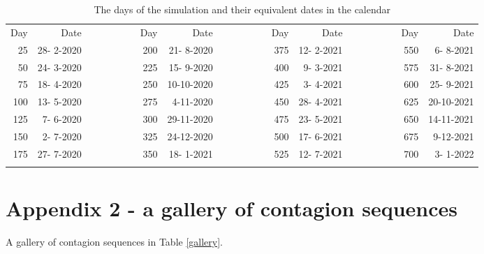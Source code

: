 \documentclass[graybox]{svmult}
\begin{document}
\begin{table}[t]
\begin{center}
\begin{footnotesize}
\begin{tabular}{rrrrrrrrrrr}
\hline\noalign{\smallskip}
 Day & Date  &~~~~~~~~& Day & Date &~~~~~~~~& Day & Date &~~~~~~~~& Day & Date \\
 \noalign{\smallskip}\svhline\noalign{\smallskip}
 25 & 28- 2-2020 & & 200 & 21- 8-2020 & & 375 & 12- 2-2021 & & 550 &  6- 8-2021 \\
 50 & 24- 3-2020 & & 225 & 15- 9-2020 & & 400 &  9- 3-2021 & & 575 & 31- 8-2021 \\
 75 & 18- 4-2020 & & 250 & 10-10-2020 & & 425 &  3- 4-2021 & & 600 & 25- 9-2021 \\
100 & 13- 5-2020 & & 275 &  4-11-2020 & & 450 & 28- 4-2021 & & 625 & 20-10-2021 \\
125 &  7- 6-2020 & & 300 & 29-11-2020 & & 475 & 23- 5-2021 & & 650 & 14-11-2021 \\
150 &  2- 7-2020 & & 325 & 24-12-2020 & & 500 & 17- 6-2021 & & 675 &  9-12-2021 \\
175 & 27- 7-2020 & & 350 & 18- 1-2021 & & 525 & 12- 7-2021 & & 700 &  3- 1-2022 \\
\hline\noalign{\smallskip}
\end{tabular}
\end{footnotesize}
\caption{The days of the simulation and their equivalent dates in the calendar}
\label{dates}
\end{center}
\end{table}


\section{Appendix 2 - a gallery of contagion sequences}
\label{app2}

A gallery of contagion sequences in Table \ref{gallery}.
\end{document}
